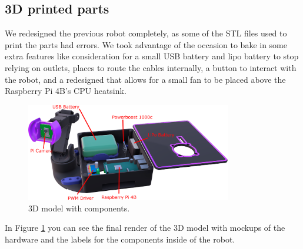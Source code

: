 \subsection{3D printed parts}

We redesigned the previous robot completely, as some of the STL files used to print the parts had errors. We took advantage of the occasion to bake in some extra features like consideration for a small USB battery and lipo battery to stop relying on outlets, places to route the cables internally, a button to interact with the robot, and a redesigned that allows for a small fan to be placed above the Raspberry Pi 4B's CPU heatsink. 


\begin{figure}[h]
    \centering
    \includegraphics[width = 0.8\textwidth]{resources/final_robot_assembly_view2.png}
    \caption{3D model with components.}\label{fig:robot_assembly_view_2}
\end{figure}


In Figure \ref{fig:robot_assembly_view_2} you can see the final render of the 3D model with mockups of the hardware and the labels for the components inside of the robot. 
